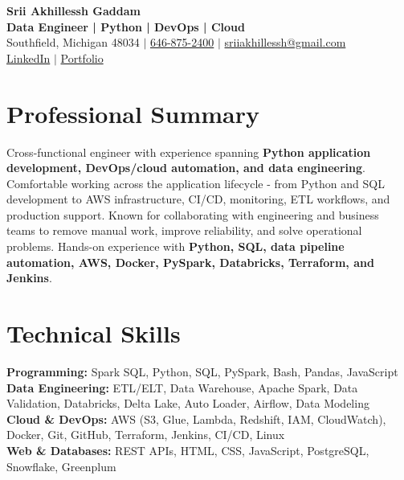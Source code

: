 \documentclass[letterpaper,10pt]{article}
\begin{document}
\fontsize{9.35pt}{10.45pt}\selectfont

\begin{center}
    {\LARGE \textbf{Srii Akhillessh Gaddam}} \\[-1pt]
    \textbf{Data Engineer | Python | DevOps | Cloud} \\[2pt]
    Southfield, Michigan 48034 $|$
    \href{tel:6468752400}{646-875-2400} $|$
    \href{mailto:sriiakhillessh@gmail.com}{sriiakhillessh@gmail.com} \\[1pt]
    \href{https://www.linkedin.com/in/srii-akhiilessh-gaddam-b48668191/}{LinkedIn} $|$
    \href{https://sriiakhillesshg.github.io/portfolio/}{Portfolio}
\end{center}
\vspace{-8pt}

\section{Professional Summary}
\small{Cross-functional engineer with experience spanning \textbf{Python application development, DevOps/cloud automation, and data engineering}. Comfortable working across the application lifecycle - from Python and SQL development to AWS infrastructure, CI/CD, monitoring, ETL workflows, and production support. Known for collaborating with engineering and business teams to remove manual work, improve reliability, and solve operational problems. Hands-on experience with \textbf{Python, SQL, data pipeline automation, AWS, Docker, PySpark, Databricks, Terraform, and Jenkins}.}

\section{Technical Skills}
\small{
\textbf{Programming:} Spark SQL, Python, SQL, PySpark, Bash, Pandas, JavaScript \\
\textbf{Data Engineering:} ETL/ELT, Data Warehouse, Apache Spark, Data Validation, Databricks, Delta Lake, Auto Loader, Airflow, Data Modeling \\
\textbf{Cloud \& DevOps:} AWS (S3, Glue, Lambda, Redshift, IAM, CloudWatch), Docker, Git, GitHub, Terraform, Jenkins, CI/CD, Linux \\
\textbf{Web \& Databases:} REST APIs, HTML, CSS, JavaScript, PostgreSQL, Snowflake, Greenplum
}
\end{document}
